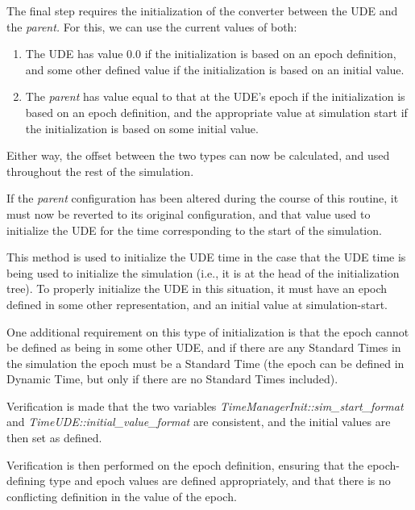 {\begin{enumerate}
{\begin{enumerate}
The final step requires the initialization of the converter between the
UDE and the \textit{parent.  }For this, we can use the current values
of both:


\begin{enumerate}
\item The UDE has value 0.0 if the initialization is based on an epoch
definition, and some other defined value if the initialization is based on an
initial value.
\item The \textit{parent} has value equal to that at the
UDE's epoch if the initialization is based on an epoch
definition, and the appropriate value at simulation start if the
initialization is based on some initial value.
\end{enumerate}
Either way, the offset between the two types can now be calculated, and
used throughout the rest of the simulation.




If the \textit{parent }configuration has been altered during the course
of this routine, it must now be reverted to its original configuration,
and that value used to initialize the UDE for the time corresponding to
the start of the simulation.

This method is used to initialize the UDE time in the case that the UDE
time is being used to initialize the simulation (i.e., it is at the head
of the initialization tree).  To properly initialize the UDE in this
situation, it must have an epoch defined in some other representation,
and an initial value at simulation-start.  

One additional requirement
on this type of initialization is that the epoch cannot be defined as
being in some other UDE, and if there are any
Standard Times in the simulation the epoch must be a Standard Time (the epoch 
can be defined in Dynamic
Time, but only if there are no Standard Times included).

Verification is made that the two variables
\textit{TimeManagerInit::sim\_start\_format } and
\textit{TimeUDE::initial\_value\_format} are consistent, and the
initial values are then set as defined.

Verification is then performed on the epoch definition, ensuring that
the epoch-defining type and epoch values are defined appropriately, and
that there is no conflicting definition in the value of the epoch.


\end{enumerate}}
\end{enumerate}}

